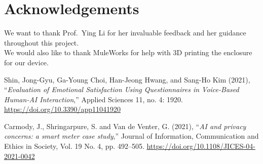 \documentclass[12pt]{article}
\begin{document}
\section*{Acknowledgements}
We want to thank Prof.~Ying Li for her invaluable feedback and her guidance throughout this project. \\
We would also like to thank MuleWorks for help with 3D printing the enclosure for our device.

\begin{thebibliography}{1}

Shin, Jong-Gyu, Ga-Young Choi, Han-Jeong Hwang, and Sang-Ho Kim (2021), ``\emph{Evaluation of Emotional Satisfaction Using Questionnaires in Voice-Based Human-AI Interaction},'' Applied Sciences 11, no. 4: 1920. \href{https://doi.org/10.3390/app11041920}{https://doi.org/10.3390/app11041920}

Carmody, J., Shringarpure, S. and Van de Venter, G. (2021), ``\emph{AI and privacy concerns: a smart meter case study},'' Journal of Information, Communication and Ethics in Society, Vol. 19 No. 4, pp. 492--505. \href{https://doi.org/10.1108/JICES-04-2021-0042}{https://doi.org/10.1108/JICES-04-2021-0042}

\end{thebibliography}
\end{document}
